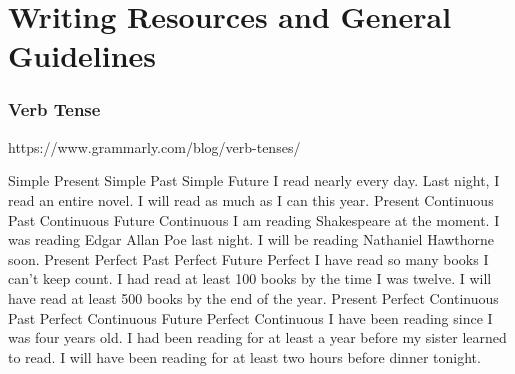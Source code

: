 \section{Writing Resources and General Guidelines}
\label{sec:writing}


\subsubsection{Verb Tense}

https://www.grammarly.com/blog/verb-tenses/


Simple Present  Simple Past Simple Future
I read nearly every day.    Last night, I read an entire novel. I will read as much as I can this year.
Present Continuous  Past Continuous Future Continuous
I am reading Shakespeare at the moment. I was reading Edgar Allan Poe last night.   I will be reading Nathaniel Hawthorne soon.
Present Perfect Past Perfect    Future Perfect
I have read so many books I can’t keep count.   I had read at least 100 books by the time I was twelve. I will have read at least 500 books by the end of the year.
Present Perfect Continuous  Past Perfect Continuous Future Perfect Continuous
I have been reading since I was four years old. I had been reading for at least a year before my sister learned to read.    I will have been reading for at least two hours before dinner tonight.
